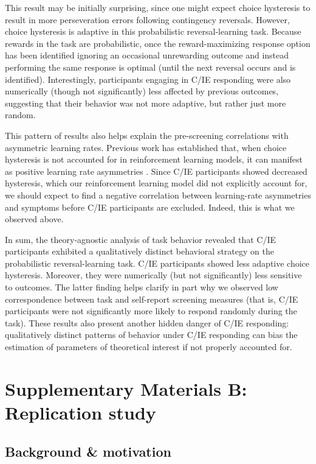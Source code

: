 \documentclass[a4paper,notitlepage,12pt]{article}
\begin{document}
This result may be initially surprising, since one might expect choice hysteresis to result in more perseveration errors following contingency reversals. However, choice hysteresis is adaptive in this probabilistic reversal-learning task. Because rewards in the task are probabilistic, once the reward-maximizing response option has been identified ignoring an occasional unrewarding outcome and instead performing the same response is optimal (until the next reversal occurs and is identified). Interestingly, participants engaging in C/IE responding were also numerically (though not significantly) less affected by previous outcomes, suggesting that their behavior was not more adaptive, but rather just more random.

This pattern of results also helps explain the pre-screening correlations with asymmetric learning rates. Previous work has established that, when choice hysteresis is not accounted for in reinforcement learning models, it can manifest as positive learning rate asymmetries \cite{Katahira2018-ke, sugawara2021dissociation}. Since C/IE participants showed decreased hysteresis, which our reinforcement learning model did not explicitly account for, we should expect to find a negative correlation between learning-rate asymmetries and symptoms before C/IE participants are excluded. Indeed, this is what we observed above. 

In sum, the theory-agnostic analysis of task behavior revealed that C/IE participants exhibited a qualitatively distinct behavioral strategy on the probabilistic reversal-learning task. C/IE participants showed less adaptive choice hysteresis. Moreover, they were numerically (but not significantly) less sensitive to outcomes. The latter finding helps clarify in part why we observed low correspondence between task and self-report screening measures (that is, C/IE participants were not significantly more likely to respond randomly during the task). These results also present another hidden danger of C/IE responding: qualitatively distinct patterns of behavior under C/IE responding can bias the estimation of parameters of theoretical interest if not properly accounted for. 

\break
{}
\section*{Supplementary Materials B: Replication study}

\subsection*{Background \& motivation}
\end{document}
